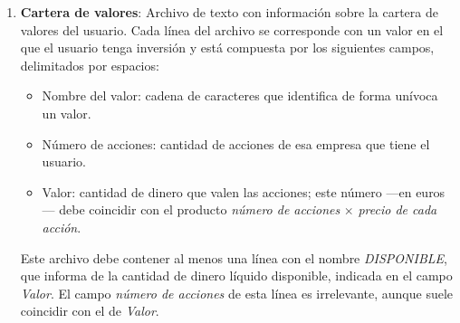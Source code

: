 \documentclass[a4paper, 11pt, titlepage]{article}
\theoremstyle{definition}
\begin{document}
    \begin{enumerate}
        \item \textbf{Cartera de valores}: Archivo de texto con información sobre la cartera de valores del usuario. Cada línea del archivo se corresponde con un valor en el que el usuario tenga inversión y está compuesta por los siguientes campos, delimitados por espacios:
        \begin{itemize}
            \item Nombre del valor: cadena de caracteres que identifica de forma unívoca un valor.
            \item Número de acciones: cantidad de acciones de esa empresa que tiene el usuario.
            \item Valor: cantidad de dinero que valen las acciones; este número ---en euros--- debe coincidir con el producto \emph{número de acciones} $\times$ \emph{precio de cada acción}.
        \end{itemize}
        Este archivo debe contener al menos una línea con el nombre \emph{DISPONIBLE}, que informa de la cantidad de dinero líquido disponible, indicada en el campo \emph{Valor}. El campo \emph{número de acciones} de esta línea es irrelevante, aunque suele coincidir con el de \emph{Valor}.


\end{enumerate}
\end{document}
